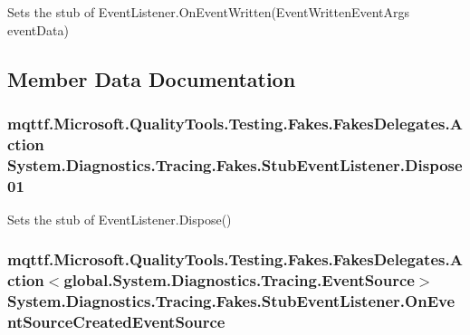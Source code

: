 Sets the stub of Event\-Listener.\-On\-Event\-Written(\-Event\-Written\-Event\-Args event\-Data)



\subsection{Member Data Documentation}
\hypertarget{class_system_1_1_diagnostics_1_1_tracing_1_1_fakes_1_1_stub_event_listener_a5a3f4c2b77216b4e662b1c1b4ec745bd}{
\subsubsection[{Dispose01}]{\setlength{\rightskip}{0pt plus 5cm}mqttf.\-Microsoft.\-Quality\-Tools.\-Testing.\-Fakes.\-Fakes\-Delegates.\-Action System.\-Diagnostics.\-Tracing.\-Fakes.\-Stub\-Event\-Listener.\-Dispose01}}\label{class_system_1_1_diagnostics_1_1_tracing_1_1_fakes_1_1_stub_event_listener_a5a3f4c2b77216b4e662b1c1b4ec745bd}


Sets the stub of Event\-Listener.\-Dispose()

\hypertarget{class_system_1_1_diagnostics_1_1_tracing_1_1_fakes_1_1_stub_event_listener_a54d2793e91ce1ecec46b0b5e0c01ad85}{
\subsubsection[{On\-Event\-Source\-Created\-Event\-Source}]{\setlength{\rightskip}{0pt plus 5cm}mqttf.\-Microsoft.\-Quality\-Tools.\-Testing.\-Fakes.\-Fakes\-Delegates.\-Action$<$global.\-System.\-Diagnostics.\-Tracing.\-Event\-Source$>$ System.\-Diagnostics.\-Tracing.\-Fakes.\-Stub\-Event\-Listener.\-On\-Event\-Source\-Created\-Event\-Source}}\label{class_system_1_1_diagnostics_1_1_tracing_1_1_fakes_1_1_stub_event_listener_a54d2793e91ce1ecec46b0b5e0c01ad85}



